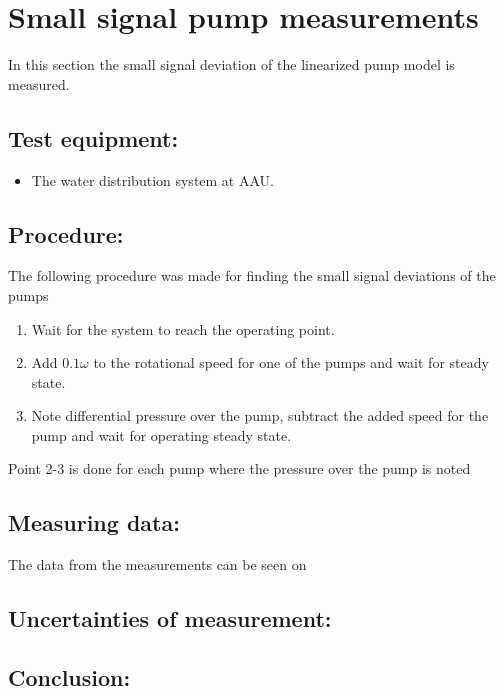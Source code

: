 \section{Small signal pump measurements}
\label{sec:small_sig_pump}

In this section the small signal deviation of the linearized pump model is measured.


\subsection*{Test equipment:}
\begin{itemize}
\item The water distribution system at AAU.
\end{itemize}

\subsection*{Procedure:}
The following procedure was made for finding the small signal deviations of the pumps
\begin{enumerate}
\item Wait for the system to reach the operating point.
\item Add $0.1\omega$ to the rotational speed for one of the pumps and wait for steady state.
\item Note differential pressure over the pump, subtract the added speed for the pump and wait for operating steady state. 
\end{enumerate}
Point 2-3 is done for each pump where the pressure over the pump is noted 

\subsection*{Measuring data:}
The data from the measurements can be seen on 


% 

\subsection*{Uncertainties of measurement:}

\subsection*{Conclusion:}



